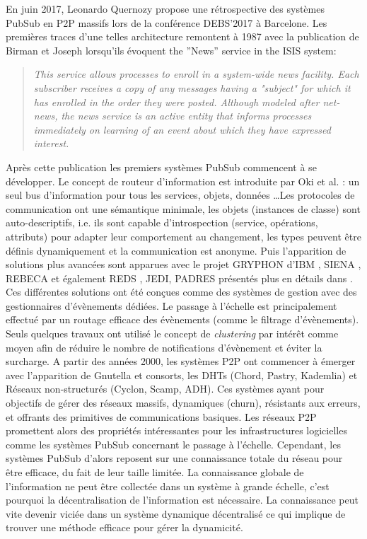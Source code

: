En juin 2017, Leonardo Quernozy propose une rétrospective des systèmes 
\gls{PubSub} en \gls{P2P} massifs lors de la conférence DEBS'2017 à 
Barcelone. 
Les premières traces d'une telles architecture remontent à 1987 avec 
la publication de Birman et Joseph \cite{Birman1987} lorsqu'ils évoquent \og 
the ''News'' service in the ISIS system\fg{}:

\blockcquote{Birman1987}{
	\og\textit{ This service allows processes to enroll in a 
		system-wide news facility. Each subscriber receives a
		copy of any messages having a "subject" for which it 
		has enrolled in the order they were posted. Although 
		modeled after net-news, the news service is an active 
		entity that informs processes immediately on learning 
		of an event about which they have expressed interest.}\fg{}
}

Après cette publication les premiers systèmes \gls{PubSub} commencent à 
se développer. Le concept de routeur d'information est introduite par Oki et al. 
\cite{Oki1993} : un seul bus d'information pour tous les services, objets, données 
\ldots Les protocoles de communication ont une sémantique minimale, 
les objets (instances de classe) sont auto-descriptifs, i.e. ils sont 
capable d'introspection (service, opérations, attributs) pour adapter leur 
comportement au changement, les types peuvent être définis dynamiquement et 
la communication est anonyme. 
Puis l'apparition de solutions plus avancées sont apparues avec le projet 
GRYPHON d'IBM \cite{Banavar1999}, SIENA \cite{Carzaniga2000}, REBECA 
\cite{Parzyjegla2010} et également REDS , JEDI, PADRES présentés plus en 
détails dans \cite{Tarkoma2012}.
Ces différentes solutions ont été conçues comme des systèmes de gestion avec 
des gestionnaires d'évènements dédiées. Le passage à l'échelle est 
principalement effectué par un routage efficace des évènements (comme le 
filtrage d'évènements). Seuls quelques travaux ont utilisé le concept de 
\textit{clustering} par intérêt comme moyen afin de réduire le nombre de 
notifications d'évènement et éviter la surcharge. 
A partir des années 2000, les 
systèmes \gls{P2P} ont commencer à émerger avec 
l'apparition de Gnutella et consorts, les DHTs (Chord, Pastry, Kademlia) et  
Réseaux non-structurés (Cyclon, Scamp, ADH). Ces systèmes ayant pour 
objectifs de gérer des réseaux massifs, dynamiques (churn), résistants aux 
erreurs, et offrants des primitives de communications basiques.
Les réseaux P2P promettent alors des propriétés intéressantes pour les 
infrastructures logicielles comme les systèmes PubSub concernant le passage à 
l'échelle. Cependant, les systèmes PubSub d'alors reposent sur une connaissance 
totale du réseau pour être efficace, du fait de leur taille limitée. La connaissance 
globale de l'information ne peut être collectée dans un système à grande échelle, 
c'est pourquoi la décentralisation de l'information est nécessaire. La connaissance 
peut vite devenir viciée dans un système dynamique décentralisé ce qui implique 
de trouver une méthode efficace pour gérer la dynamicité.

